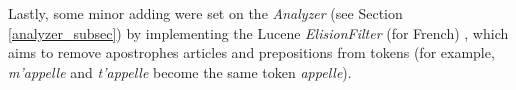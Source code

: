 Lastly, some minor adding were set on the \textit{Analyzer} (see Section \ref{analyzer_subsec}) by implementing the Lucene \textit{ElisionFilter} (for French) \cite{luceneelisionfilter}, which aims to remove apostrophes articles and prepositions from tokens (for example, \textit{m'appelle} and \textit{t'appelle} become the same token \textit{appelle}).




